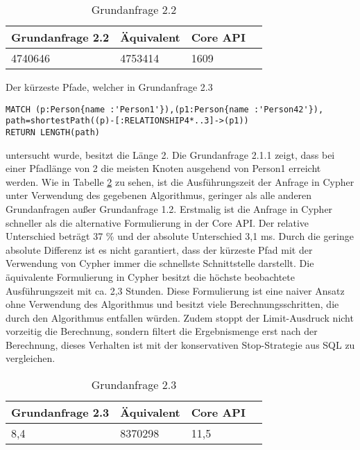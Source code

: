 \FloatBarrier
\begin{table}[h]
	\centering
		\begin{tabular}{ |p{3cm}|p{3cm}|p{3cm}|p{3cm}|  }
			\hline
			Grundanfrage 2.2 & Äquivalent&Core API\\
			\hline
			4740646    & 4753414 &  1609\\
			\hline
		\end{tabular}
		\caption{Grundanfrage 2.2}
		\label{tab:Query2_2}
\end{table}
\FloatBarrier
\noindent Der kürzeste Pfade, welcher in Grundanfrage 2.3
\begin{Verbatim}[frame=single]
MATCH (p:Person{name :'Person1'}),(p1:Person{name :'Person42'}),
path=shortestPath((p)-[:RELATIONSHIP4*..3]->(p1)) 
RETURN LENGTH(path)
\end{Verbatim} 
 untersucht wurde, besitzt die Länge 2. Die Grundanfrage 2.1.1 zeigt, dass bei einer Pfadlänge von 2 die meisten Knoten ausgehend von Person1 erreicht werden. Wie in Tabelle \ref{tab:Query2_3} zu sehen, ist die Ausführungszeit der Anfrage in Cypher unter Verwendung des gegebenen Algorithmus, geringer als alle anderen Grundanfragen außer Grundanfrage 1.2. Erstmalig ist die Anfrage in Cypher schneller als die alternative Formulierung in der Core API. Der relative Unterschied beträgt 37 \% und  der absolute Unterschied 3,1 ms. Durch die geringe absolute Differenz ist es nicht garantiert, dass der kürzeste Pfad mit der Verwendung von Cypher immer die schnellste Schnittstelle darstellt. \newline
Die äquivalente Formulierung in Cypher besitzt die höchste beobachtete Ausführungszeit mit ca. 2,3 Stunden. Diese Formulierung ist eine naiver Ansatz ohne Verwendung des Algorithmus und besitzt viele Berechnungsschritten, die durch den Algorithmus entfallen würden. Zudem stoppt der Limit-Ausdruck nicht vorzeitig die Berechnung, sondern filtert die Ergebnismenge erst nach der Berechnung, dieses Verhalten ist mit der konservativen Stop-Strategie aus SQL zu vergleichen\parencite{carey1997saying}.   
\FloatBarrier
\begin{table}[!htb]
	\centering
		\begin{tabular}{ |p{3cm}|p{3cm}|p{3cm}|p{3cm}|  }
			\hline
			Grundanfrage 2.3 & Äquivalent&Core API\\
			\hline
			8,4    & 8370298 &  11,5\\
			\hline
		\end{tabular}
		\caption{Grundanfrage 2.3}
		\label{tab:Query2_3}
\end{table}
